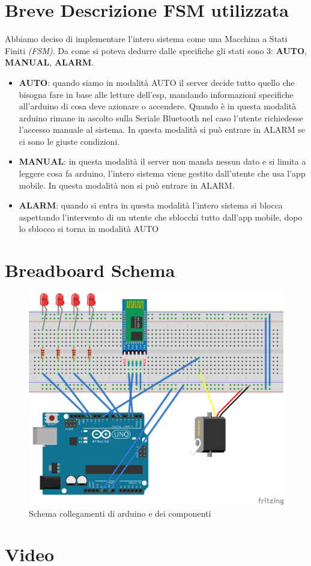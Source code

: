 \documentclass[a4paper,12pt]{report}
\begin{document}
	\chapter{Breve Descrizione FSM utilizzata}
	Abbiamo deciso di implementare l'intero sistema come una Macchina a Stati Finiti \textit{(FSM)}. Da come si poteva dedurre dalle specifiche gli stati sono 3: \textbf{AUTO}, \textbf{MANUAL}, \textbf{ALARM}.
	\begin{itemize}
		\item \textbf{AUTO}: quando siamo in modalità AUTO il server decide tutto quello che bisogna fare in base alle letture dell'esp, mandando informazioni specifiche all'arduino di cosa deve azionare o accendere. Quando è in questa modalità arduino rimane in ascolto sulla Seriale Bluetooth nel caso l'utente richiedesse l'accesso manuale al sistema. In questa modalità si può entrare in ALARM se ci sono le giuste condizioni.
		\item \textbf{MANUAL}: in questa modalità il server non manda nessun dato e si limita a leggere cosa fa arduino, l'intero sistema viene gestito dall'utente che usa l'app mobile. In questa modalità non si può entrare in ALARM.
		\item \textbf{ALARM}: quando si entra in questa modalità l'intero sistema si blocca aspettando l'intervento di un utente che sblocchi tutto dall'app mobile, dopo lo sblocco si torna in modalità AUTO
	\end{itemize}
	\chapter{Breadboard Schema}
		\begin{figure}[!htb]
			\centerline{\includegraphics[scale=0.9]{iot3_bb.png}}
			\caption{Schema collegamenti di arduino e dei componenti}
			\label{img:analysis}
		\end{figure}	
	\chapter{Video}
	
	
\end{document}
